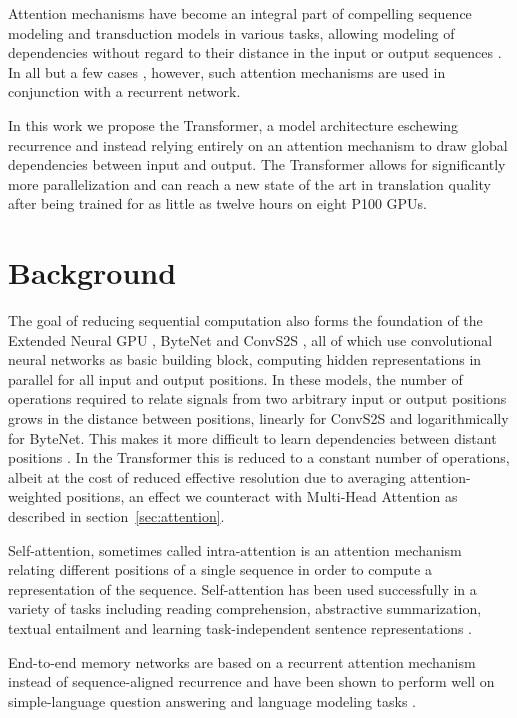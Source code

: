 Attention mechanisms have become an integral part of compelling sequence modeling and transduction models in various tasks, allowing modeling of dependencies without regard to their distance in the input or output sequences \citep{bahdanau2014neural, structuredAttentionNetworks}. In all but a few cases \citep{decomposableAttnModel}, however, such attention mechanisms are used in conjunction with a recurrent network.

In this work we propose the Transformer, a model architecture eschewing recurrence and instead relying entirely on an attention mechanism to draw global dependencies between input and output. The Transformer allows for significantly more parallelization and can reach a new state of the art in translation quality after being trained for as little as twelve hours on eight P100 GPUs.


\section{Background}

The goal of reducing sequential computation also forms the foundation of the Extended Neural GPU \citep{extendedngpu}, ByteNet \citep{NalBytenet2017} and ConvS2S \citep{JonasFaceNet2017}, all of which use convolutional neural networks as basic building block, computing hidden representations in parallel for all input and output positions. In these models, the number of operations required to relate signals from two arbitrary input or output positions grows in the distance between positions, linearly for ConvS2S and logarithmically for ByteNet. This makes it more difficult to learn dependencies between distant positions \citep{hochreiter2001gradient}. In the Transformer this is reduced to a constant number of operations, albeit at the cost of reduced effective resolution due to averaging attention-weighted positions, an effect we counteract with Multi-Head Attention as described in section~\ref{sec:attention}.

Self-attention, sometimes called intra-attention is an attention mechanism relating different positions of a single sequence in order to compute a representation of the sequence. Self-attention has been used successfully in a variety of tasks including reading comprehension, abstractive summarization, textual entailment and learning task-independent sentence representations \citep{cheng2016long, decomposableAttnModel, paulus2017deep, lin2017structured}.

End-to-end memory networks are based on a recurrent attention mechanism instead of sequence-aligned recurrence and have been shown to perform well on simple-language question answering and language modeling tasks \citep{sukhbaatar2015}.

